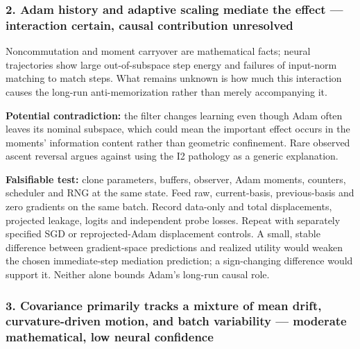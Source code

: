 \documentclass[
  british,
  10pt,
  a4paper,
]{article}
\begin{document}
\subsubsection{2. Adam history and adaptive scaling mediate the effect
--- interaction certain, causal contribution
unresolved}\label{synthesis--adam-history-and-adaptive-scaling-mediate-the-effect-interaction-certain-causal-contribution-unresolved}

Noncommutation and moment carryover are mathematical facts; neural
trajectories show large out-\allowbreak{}of-\allowbreak{}subspace step
energy and failures of input-norm matching to match steps. What remains
unknown is how much this interaction causes the long-run
anti-\allowbreak{}memorization\allowbreak{} rather than merely
accompanying it.

\textbf{Potential contradiction:} the filter changes learning even
though Adam often leaves its nominal subspace, which could mean the
important effect occurs in the moments' information content rather than
geometric confinement.\allowbreak{} Rare observed ascent reversal argues
against using the I2 pathology as a generic explanation.\allowbreak{}

\textbf{Falsifiable test:} clone parameters,\allowbreak{} buffers,
observer, Adam moments, counters, scheduler and RNG at the same state.
Feed raw, current-\allowbreak{}basis,\allowbreak{}
previous-\allowbreak{}basis and zero gradients on the same batch. Record
data-only and total displacement\allowbreak{}s,\allowbreak{} projected
leakage, logits and independent probe losses. Repeat with separately
specified SGD or reprojected-\allowbreak{}Adam displacement controls. A
small, stable difference between gradient-\allowbreak{}space predictions
and realized utility would weaken the chosen immediate-\allowbreak{}step
mediation prediction; a sign-\allowbreak{}changing difference would
support it. Neither alone bounds Adam's long-run causal role.

\subsubsection{\texorpdfstring{3. Covariance primarily tracks a mixture
of mean drift, curvature-\allowbreak{}driven motion, and batch
variability --- moderate mathematical\allowbreak{},\allowbreak{} low
neural
confidence}{3. Covariance primarily tracks a mixture of mean drift,  motion, and batch variability --- moderate  low neural confidence}}\label{synthesis--covariance-primarily-tracks-a-mixture-of-mean-drift-curvature-driven-motion-and-batch-variability-moderate-mathematical-low-neural-confidence}
\end{document}
